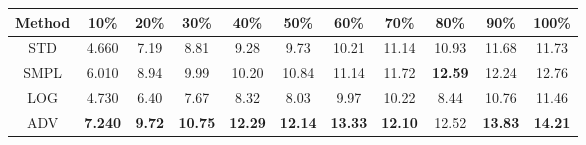\documentclass{standalone}
\begin{document}
\begin{tabular}{c|cccccccccc}
      \toprule
      Method & 10\% & 20\% & 30\% & 40\% & 50\% & 60\% & 70\% & 80\% & 90\% & 100\% \\
      \midrule
STD & 4.660 & 7.19 & 8.81 & 9.28 & 9.73 & 10.21 & 11.14 & 10.93 & 11.68 & 11.73\\
SMPL & 6.010 & 8.94 & 9.99 & 10.20 & 10.84 & 11.14 & 11.72 & \textbf{12.59} & 12.24 & 12.76\\
LOG & 4.730 & 6.40 & 7.67 & 8.32 & 8.03 & 9.97 & 10.22 & 8.44 & 10.76 & 11.46\\
ADV & \textbf{7.240} & \textbf{9.72} & \textbf{10.75} & \textbf{12.29} & \textbf{12.14} & \textbf{13.33} & \textbf{12.10} & 12.52 & \textbf{13.83} & \textbf{14.21}\\
  \bottomrule
\end{tabular}
\end{document}
